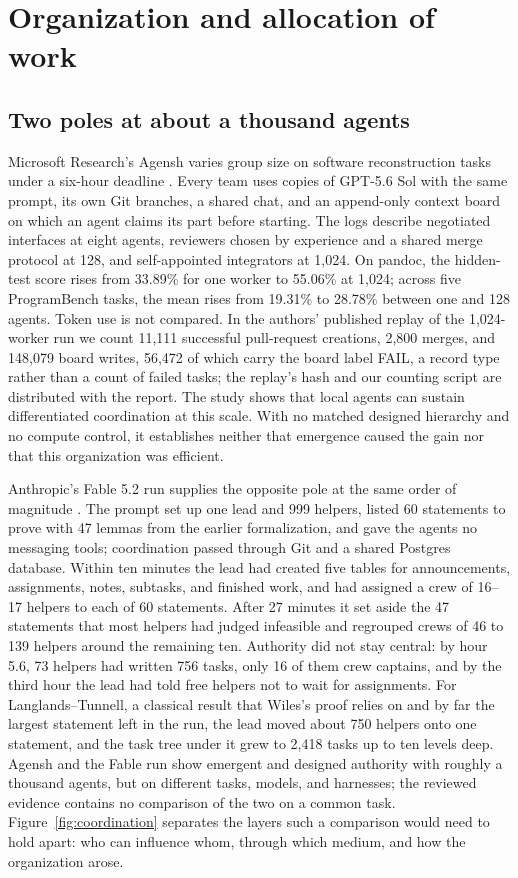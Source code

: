 \section{Organization and allocation of work}
\label{sec:organization}
\subsection{Two poles at about a thousand agents}
Microsoft Research's Agensh varies group size on software reconstruction tasks under a six-hour deadline \citep{agensh-1024}. Every team uses copies of GPT-5.6 Sol with the same prompt, its own Git branches, a shared chat, and an append-only context board on which an agent claims its part before starting. The logs describe negotiated interfaces at eight agents, reviewers chosen by experience and a shared merge protocol at 128, and self-appointed integrators at 1,024. On pandoc, the hidden-test score rises from 33.89\% for one worker to 55.06\% at 1,024; across five ProgramBench tasks, the mean rises from 19.31\% to 28.78\% between one and 128 agents. Token use is not compared. In the authors' published replay of the 1,024-worker run we count 11,111 successful pull-request creations, 2,800 merges, and 148,079 board writes, 56,472 of which carry the board label FAIL, a record type rather than a count of failed tasks; the replay's hash and our counting script are distributed with the report. The study shows that local agents can sustain differentiated coordination at this scale. With no matched designed hierarchy and no compute control, it establishes neither that emergence caused the gain nor that this organization was efficient.

Anthropic's Fable 5.2 run supplies the opposite pole at the same order of magnitude \citep{anthropic-fable-team-scaling}. The prompt set up one lead and 999 helpers, listed 60 statements to prove with 47 lemmas from the earlier formalization, and gave the agents no messaging tools; coordination passed through Git and a shared Postgres database. Within ten minutes the lead had created five tables for announcements, assignments, notes, subtasks, and finished work, and had assigned a crew of 16--17 helpers to each of 60 statements. After 27 minutes it set aside the 47 statements that most helpers had judged infeasible and regrouped crews of 46 to 139 helpers around the remaining ten. Authority did not stay central: by hour 5.6, 73 helpers had written 756 tasks, only 16 of them crew captains, and by the third hour the lead had told free helpers not to wait for assignments. For Langlands--Tunnell, a classical result that Wiles's proof relies on and by far the largest statement left in the run, the lead moved about 750 helpers onto one statement, and the task tree under it grew to 2,418 tasks up to ten levels deep. Agensh and the Fable run show emergent and designed authority with roughly a thousand agents, but on different tasks, models, and harnesses; the reviewed evidence contains no comparison of the two on a common task. Figure~\ref{fig:coordination} separates the layers such a comparison would need to hold apart: who can influence whom, through which medium, and how the organization arose.

